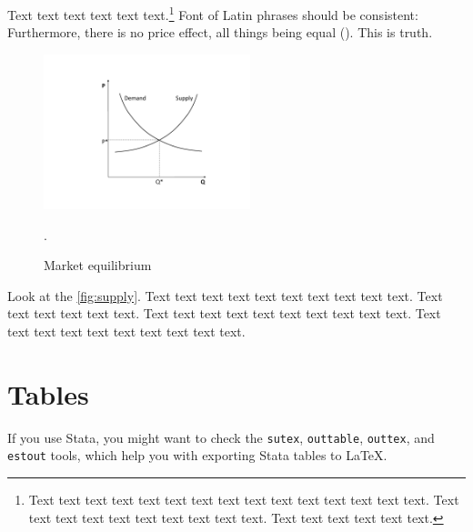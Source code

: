 Text text text text text text.\footnote{Text text text text text text text text text text text text text text text. Text text text text text text text text text text. Text text text text text text.} Font of Latin phrases should be consistent: Furthermore, there is no  price effect, all things being equal (). This is  truth.

\begin{figure}[!htbp]
\begin{center}
\caption{Market equilibrium}
\label{fig:supply}
\includegraphics[width=60mm]{Figures/supplydemand}
\end{center}\vspace{-0.5cm}
\begin{source}\cite{Haufler2006}.\end{source}
\end{figure}

Look at the \autoref{fig:supply}. Text text text text text text text text text text. Text text text text text text. Text text text text text text text text text text. Text text text text text text text text text text.



\section{Tables}

If you use Stata, you might want to check the \texttt{sutex}, \texttt{outtable}, \texttt{outtex}, and \texttt{estout} tools, which help you with exporting Stata tables to \LaTeX{}.

